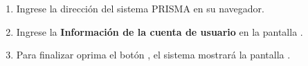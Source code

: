 \begin{enumerate}

	\item Ingrese la dirección del sistema PRISMA en su navegador.
	
	\item Ingrese la \textbf{Información de la cuenta de usuario} en la pantalla .
	
	
	\item Para finalizar oprima el botón , el sistema mostrará la pantalla
 	. 
 	
		
\end{enumerate}
